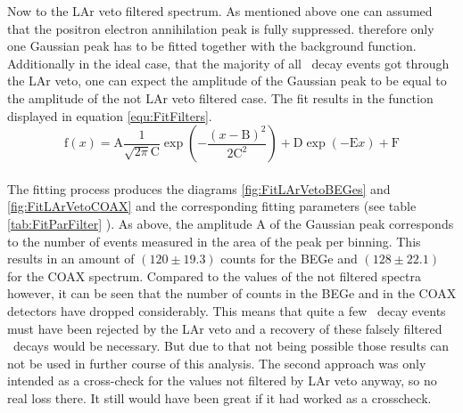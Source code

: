 \documentclass[encoding=utf8,british]{tumphthesis}
\begin{document}
Now to the LAr veto filtered spectrum.
As mentioned above one can assumed that the positron electron annihilation peak is fully suppressed.
therefore only one Gaussian peak has to be fitted together with the background function.
Additionally in the ideal case, that the majority of all \Kr\ decay events got through the LAr veto, one can expect the amplitude of the Gaussian peak to be equal to the amplitude of the not LAr veto filtered case.
The fit results in the function displayed in equation \ref{equ:FitFilters}.
\\ 

\begin{equation}
\mathrm{f}(x) = \mathrm{A}\frac{1}{\sqrt{2\pi}\mathrm{C}}\exp\left(-\frac{(x-\mathrm{B})^2}{2\mathrm{C}^2}\right) + \mathrm{D}\exp\left(\mathrm{-E}x\right) + \mathrm{F}
\label{equ:FitFilters}
\end{equation}
\\

The fitting process produces the diagrams \ref{fig:FitLArVetoBEGes} and \ref{fig:FitLArVetoCOAX} and the corresponding fitting parameters (see table \ref{tab:FitParFilter} ).
As above, the amplitude A of the Gaussian peak corresponds to the number of events measured in the area of the peak per binning.
This results in an amount of $(120\pm19.3)$ counts for the BEGe and $(128\pm22.1)$ for the COAX spectrum.
Compared to the values of the not filtered spectra however, it can be seen that the number of counts in the BEGe and in the COAX detectors have dropped considerably.
This means that quite a few  \Kr\ decay events must have been rejected by the LAr veto and a recovery of these falsely filtered \Kr\ decays would be necessary.
But due to that not being possible those results can not be used in further course of this analysis.
The second approach was only intended as a cross-check for the values not filtered by LAr veto anyway, so no real loss there.
It still would have been great if it had worked as a crosscheck.
\\
\end{document}
